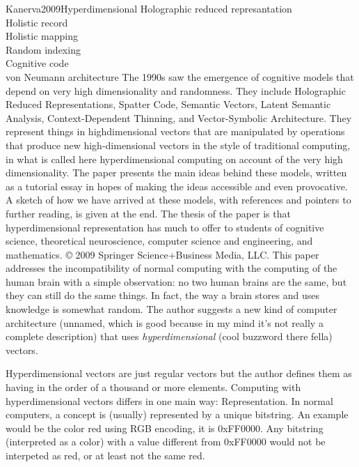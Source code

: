 \begin{review}{Kanerva2009Hyperdimensional}
                {Holographic reduced represantation\\
                 Holistic record\\
                 Holistic mapping\\
                 Random indexing\\
                 Cognitive code\\
                 von Neumann architecture}
                {
                    The 1990s saw the emergence of cognitive models that depend on very high dimensionality and randomness. They include Holographic Reduced Representations, Spatter Code, Semantic Vectors, Latent Semantic Analysis, Context-Dependent Thinning, and Vector-Symbolic Architecture. They represent things in highdimensional vectors that are manipulated by operations that produce new high-dimensional vectors in the style of traditional computing, in what is called here hyperdimensional computing on account of the very high dimensionality. The paper presents the main ideas behind these models, written as a tutorial essay in hopes of making the ideas accessible and even provocative. A sketch of how we have arrived at these models, with references and pointers to further reading, is given at the end. The thesis of the paper is that hyperdimensional representation has much to offer to students of cognitive science, theoretical neuroscience, computer science and engineering, and mathematics. © 2009 Springer Science+Business Media, LLC.
                }
    This paper addresses the incompatibility of normal computing with the computing of the human brain with a simple observation: no two human brains are the same, but they can still do the same things.
    In fact, the way a brain stores and uses knowledge is somewhat random.
    The author suggests a new kind of computer architecture (unnamed, which is good because in my mind it's not really a complete description) that uses \emph{hyperdimensional} (cool buzzword there fella) vectors.
    
    Hyperdimensional vectors are just regular vectors but the author defines them as having in the order of a thousand or more elements.
    Computing with hyperdimensional vectors differs in one main way: Representation.
    In normal computers, a concept is (usually) represented by a unique bitstring.
    An example would be the color red using RGB encoding, it is 0xFF0000.
    Any bitstring (interpreted as a color) with a value different from 0xFF0000 would not be interpeted as red, or at least not the same red.
    

\end{review}
